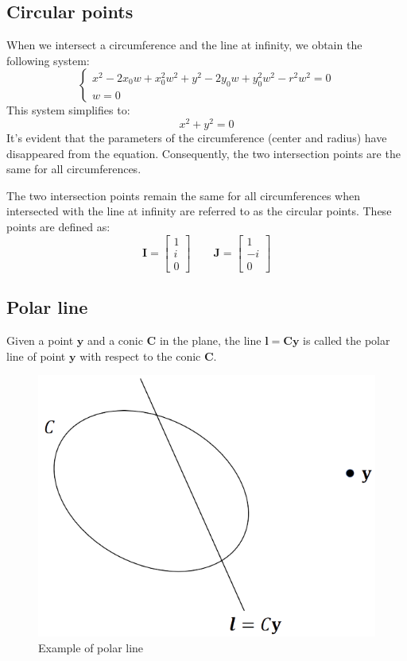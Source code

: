 \subsection{Circular points}
\begin{example}
    When we intersect a circumference and the line at infinity, we obtain the following system:
    \[\begin{cases}
        x^2-2x_0w+x_0^2w^2+y^2-2y_0w+y_0^2w^2-r^2w^2=0 \\
        w=0
    \end{cases}\]
    This system simplifies to: 
    \[x^2+y^2=0\]
    It's evident that the parameters of the circumference (center and radius) have disappeared from the equation. 
    Consequently, the two intersection points are the same for all circumferences.    
\end{example}
\begin{definition}
    The two intersection points remain the same for all circumferences when intersected with the line at infinity are referred to as the circular points.
    These points are defined as:
    \[\mathbf{I}=\begin{bmatrix} 1 \\ i \\ 0 \end{bmatrix} \qquad \mathbf{J}=\begin{bmatrix} 1 \\ -i \\ 0 \end{bmatrix}\]
\end{definition}

\subsection{Polar line}
\begin{definition}
    Given a point $\mathbf{y}$ and a conic $\mathbf{C}$ in the plane, the line $\mathbf{l}=\mathbf{Cy}$ is called the polar line of point $\mathbf{y}$ with respect to the conic $\mathbf{C}$. 
\end{definition}
\begin{figure}[H]
    \centering
    \includegraphics[width=0.3\linewidth]{images/polar.png}
    \caption{Example of polar line}
\end{figure}

